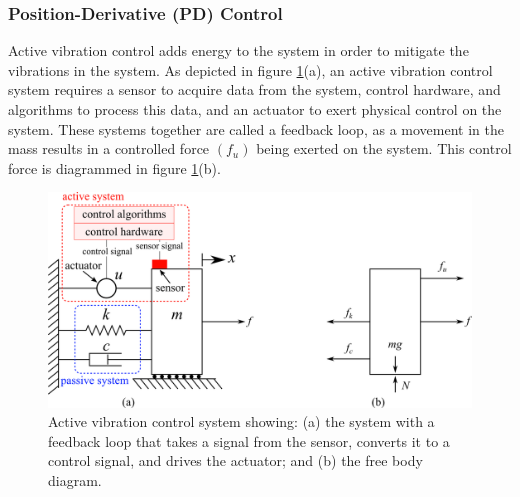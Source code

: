 \documentclass[12pt,letter]{article}
\begin{document}
\subsubsection{Position-Derivative (PD) Control}

Active vibration control adds energy to the system in order to mitigate the vibrations in the system. As depicted in figure \ref{fig:active_vibration_control_FBD}(a), an active vibration control system requires a sensor to acquire data from the system, control hardware, and algorithms to process this data, and an actuator to exert physical control on the system. These systems together are called a feedback loop, as a movement in the mass results in a controlled force $(f_u)$ being exerted on the system. This control force is diagrammed in figure \ref{fig:active_vibration_control_FBD}(b). 

\begin{figure}[H]
    \centering
    \includegraphics[width=5in]{../figures/active_vibration_control_FBD.png}
    \caption{Active vibration control system showing: (a) the system with a feedback loop that takes a signal from the sensor, converts it to a control signal, and drives the actuator; and (b) the free body diagram.}
    \label{fig:active_vibration_control_FBD}
\end{figure}
\end{document}
